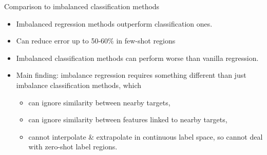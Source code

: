 \begin{frame}{Comparison to imbalanced classification methods}
\begin{table}[ht]
\begin{center}
{			}
		\end{center}
	\end{table}
	\begin{itemize}
		\item Imbalanced regression methods outperform classification ones.
		\item Can reduce error up to 50-60\% in few-shot regions
		\item Imbalanced classification methods can perform worse than vanilla regression.
		\item Main finding: imbalance regression requires something different than just imbalance classification methods, which
		\begin{itemize}
			\item can ignore similarity between nearby targets,
			\item can ignore similarity between features linked to nearby targets,
			\item cannot interpolate \& extrapolate in continuous label space, so cannot deal with zero-shot label regions.
		\end{itemize}
	\end{itemize}
\end{frame}